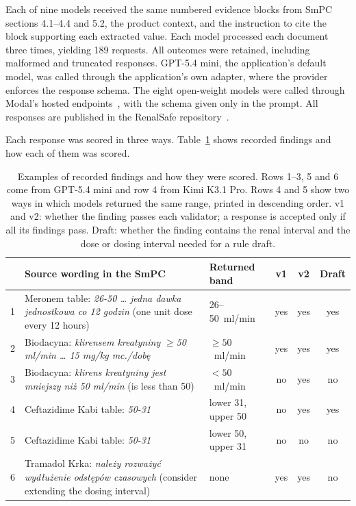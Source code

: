 \documentclass[12pt,a4paper,twoside]{book}
\begin{document}
Each of nine models received the same numbered evidence blocks from SmPC sections 4.1--4.4 and 5.2, the product context, and the instruction to cite the block supporting each extracted value.
Each model processed each document three times, yielding 189 requests.
All outcomes were retained, including malformed and truncated responses.
GPT-5.4 mini, the application's default model, was called through the application's own adapter, where the provider enforces the response schema.
The eight open-weight models were called through Modal's hosted endpoints~\cite{miscModalModelAPIs}, with the schema given only in the prompt.
All responses are published in the RenalSafe repository~\cite{miscRenalSafeRepo}.

Each response was scored in three ways.
Table~\ref{tab:extraction-scoring-examples} shows recorded findings and how each of them was scored.

\begin{table}[htbp]
    \centering
    \caption[Examples of scored findings]{Examples of recorded findings and how they were scored. Rows 1--3, 5 and 6 come from GPT-5.4 mini and row 4 from Kimi K3.1 Pro. Rows 4 and 5 show two ways in which models returned the same range, printed in descending order. v1 and v2: whether the finding passes each validator; a response is accepted only if all its findings pass. Draft: whether the finding contains the renal interval and the dose or dosing interval needed for a rule draft.}
    \label{tab:extraction-scoring-examples}
    \small
    \begin{tabularx}{\linewidth}{@{}c>{\raggedright\arraybackslash}X>{\raggedright\arraybackslash}p{2.2cm}ccc@{}}
        \toprule
        & Source wording in the SmPC & Returned band & v1 & v2 & Draft \\
        \midrule
        1 & Meronem table: \emph{26-50 \ldots{} jedna dawka jednostkowa co 12 godzin} (one unit dose every 12 hours) & \mbox{26--50~ml/min} & yes & yes & yes \\
        2 & Biodacyna: \emph{klirensem kreatyniny} \(\geq\)\emph{50 ml/min \ldots{} 15 mg/kg mc./dobę} & \(\geq 50\)~ml/min & yes & yes & yes \\
        3 & Biodacyna: \emph{klirens kreatyniny jest mniejszy niż 50 ml/min} (is less than 50) & \(< 50\)~ml/min & no & yes & no \\
        4 & Ceftazidime Kabi table: \emph{50-31} & lower 31, upper 50 & no & yes & yes \\
        5 & Ceftazidime Kabi table: \emph{50-31} & lower 50, upper 31 & no & no & no \\
        6 & Tramadol Krka: \emph{należy rozważyć wydłużenie odstępów czasowych} (consider extending the dosing interval) & none & yes & yes & no \\
        \bottomrule
    \end{tabularx}
\end{table}
\end{document}
